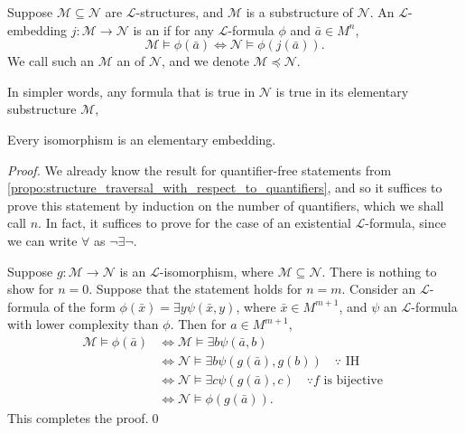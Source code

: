 \documentclass[notoc,notitlepage]{tufte-book}
\begin{document}
\begin{defn}\label{defn:elementary_embeddings}
  Suppose $\mathcal{M} \subseteq \mathcal{N}$ are $\mathcal{L}$-structures, and $\mathcal{M}$ is a substructure of $\mathcal{N}$. An $\mathcal{L}$-embedding $j : \mathcal{M} \to \mathcal{N}$ is an  if for any $\mathcal{L}$-formula $\phi$ and $\bar{a} \in M^n$,
  \begin{equation*}
    \mathcal{M} \models \phi(\bar{a}) \iff \mathcal{N} \models \phi(j( \bar{a} )).
  \end{equation*}
  We call such an $\mathcal{M}$ an  of $\mathcal{N}$, and we denote $\mathcal{M} \preceq \mathcal{N}$.
\end{defn}

In simpler words, any formula that is true in $\mathcal{N}$ is true in its elementary substructure $\mathcal{M}$,

\begin{crly}\label{crly:isomorphisms_are_elementary_embeddings}
  Every isomorphism is an elementary embedding.
\end{crly}

\begin{proof}
  We already know the result for quantifier-free statements from \cref{propo:structure_traversal_with_respect_to_quantifiers}, and so it suffices to prove this statement by induction on the number of quantifiers, which we shall call $n$. In fact, it suffices to prove for the case of an existential $\mathcal{L}$-formula, since we can write $\forall$ as $\neg \exists \neg$.

  Suppose $g : \mathcal{M} \to \mathcal{N}$ is an $\mathcal{L}$-isomorphism, where $\mathcal{M} \subseteq \mathcal{N}$. There is nothing to show for $n = 0$. Suppose that the statement holds for $n = m$. Consider an $\mathcal{L}$-formula of the form $\phi(\bar{x}) = \exists y \psi(\bar{x}, y)$, where $\bar{x} \in M^{m + 1}$, and $\psi$ an $\mathcal{L}$-formula with lower complexity than $\phi$. Then for $a \in M^{m + 1}$,
  \begin{align*}
    \mathcal{M} \models \phi(\bar{a}) &\iff \mathcal{M} \models \exists b \psi (\bar{a}, b) \\
                                      &\iff \mathcal{N} \models \exists b \psi (g(\bar{a}), g(b)) \quad \because \text{ IH } \\
                                      &\iff \mathcal{N} \models \exists c \psi (g(\bar{a}), c) \quad \because f \text{ is bijective } \\
                                      &\iff \mathcal{N} \models \phi(g(\bar{a})).
  \end{align*}
  This completes the proof.\qed\
\end{proof}
\end{document}
